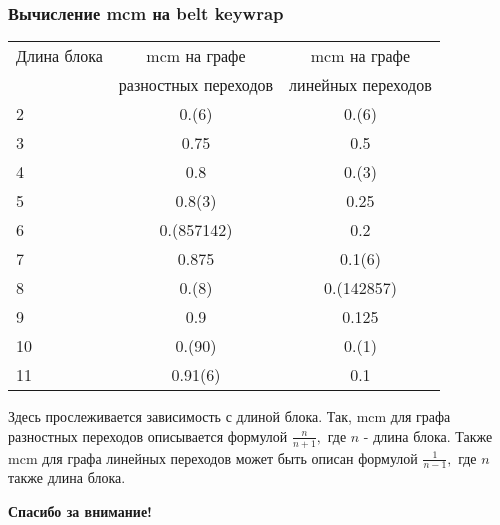 \documentclass{beamer}
\begin{document}
\begin{frame}
    \frametitle{Вычисление mcm на belt keywrap}

\begin{tabular}{ l | c | c }
  \hline			
  Длина блока & mcm на графе & mcm на графе \\
   & разностных переходов & линейных переходов \\
\hline
  2 & 0.(6) & 0.(6) \\
  3  & 0.75 & 0.5 \\
  4  & 0.8 & 0.(3) \\
  5 & 0.8(3) & 0.25 \\
  6 & 0.(857142) & 0.2 \\
  7 & 0.875 & 0.1(6) \\
  8 & 0.(8) & 0.(142857) \\
  9 & 0.9 & 0.125 \\
  10 & 0.(90) & 0.(1)  \\
  11 & 0.91(6) & 0.1 \\
  \hline  
\end{tabular}
Здесь прослеживается зависимость с длиной блока. Так, mcm для графа разностных переходов описывается формулой $\frac{n}{n+1},$ где $n$ - длина блока. Также mcm для графа линейных переходов может быть описан формулой $\frac{1}{n-1},$ где $n$ также длина блока.

  \end{frame}

\begin{frame}
\begin{center} \textbf{Спасибо за внимание!} \end{center}
\end{frame}
\end{document}

